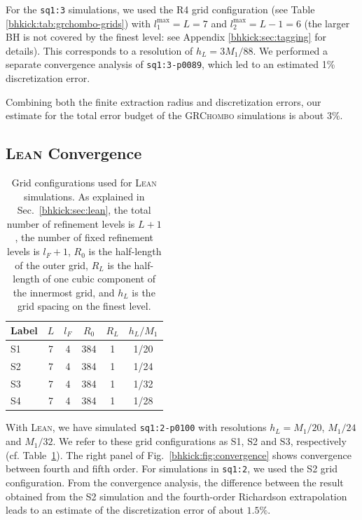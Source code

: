 For the \texttt{sq1:3} simulations, we used the R4 grid configuration
(see Table \ref{bhkick:tab:grchombo-grids}) with $l_1^{\max}=L=7$ and
$l_2^{\max}=L-1=6$ (the larger BH is not covered by the finest level:
see Appendix \ref{bhkick:sec:tagging} for details). This corresponds to a
resolution of $h_L=3M_1/88$. We performed a separate convergence
analysis of \texttt{sq1:3-p0089}, which led to an estimated 1\%
discretization error.

Combining both the finite extraction radius and discretization errors, 
our estimate for the total error budget of the \textsc{GRChombo} 
simulations is about $3\%$.


\subsection{\textsc{Lean} Convergence}
\begin{table}[b]
    
    \caption{Grid configurations used for \textsc{Lean} simulations. As 
    explained in Sec.~\ref{bhkick:sec:lean}, the total number of refinement 
    levels is $L+1$, the number of fixed refinement levels is $l_F+1$, 
    $R_0$ is the half-length of the outer grid, $R_L$ is the half-length 
    of one cubic component of the innermost grid, and $h_L$ is the grid 
    spacing on the finest level.}
    \centering
    \begin{tabular}{lccccc} \hline
        Label & $L$ & $l_F$ & $R_0$ & $R_L$ & $h_L/M_1$\\
        \hline
        S1 & 7 & 4 & 384 & 1 & 1/20\\
        S2 & 7 & 4 & 384 & 1 & 1/24\\
        S3 & 7 & 4 & 384 & 1 & 1/32\\
        S4 & 7 & 4 & 384 & 1 & 1/28\\ \hline
    \end{tabular}
    
    \label{bhkick:tab:lean-grids}
\end{table}

With \textsc{Lean}, we have simulated \texttt{sq1:2-p0100} with
resolutions $h_L = M_1/20$, $M_1/24$ and $M_1/32$. We refer to these
grid configurations as S1, S2 and S3, respectively
(cf. Table~\ref{bhkick:tab:lean-grids}). The right panel of Fig.~\ref{bhkick:fig:convergence}
shows convergence between fourth and fifth order. For simulations in
\texttt{sq1:2}, we used the S2 grid configuration. From the
convergence analysis, the difference between the result obtained from
the S2 simulation and the fourth-order Richardson extrapolation leads
to an estimate of the discretization error of about $1.5\%$.

